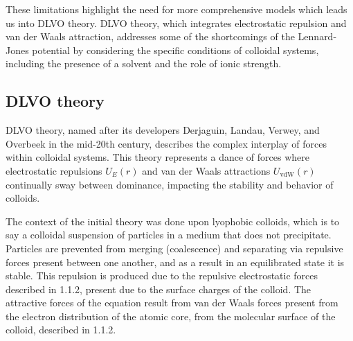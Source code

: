 




These limitations highlight the need for more comprehensive models which leads us into DLVO theory. DLVO theory, which integrates electrostatic repulsion and van der Waals attraction, addresses some of the shortcomings of the Lennard-Jones potential by considering the specific conditions of colloidal systems, including the presence of a solvent and the role of ionic strength.\cite{libretexts2020} %


\subsection{DLVO theory}



DLVO theory, named after its developers Derjaguin, Landau, Verwey, and Overbeek in the mid-20th century, describes the complex interplay of forces within colloidal systems. This theory represents a dance of forces where electrostatic repulsions \( U_E(r) \) and van der Waals attractions \( U_{\text{vdW}}(r) \) continually sway between dominance, impacting the stability and behavior of colloids.\cite{israelachvili2011intermolecular} \cite{Origin2V} \cite{DERJAGUINORIGIN}


The context of the initial theory was done upon lyophobic colloids, which is to say a colloidal suspension of particles in a medium that does not precipitate. Particles are prevented from merging (coalescence) and separating via repulsive forces present between one another, and as a result in an equilibrated state it is stable. This repulsion is produced due to the repulsive electrostatic forces described in 1.1.2, present due to the surface charges of the colloid. The attractive forces of the equation result from van der Waals forces present from the electron distribution of the atomic core, from the molecular surface of the colloid, described in 1.1.2.\cite{ninhama1999progress}

